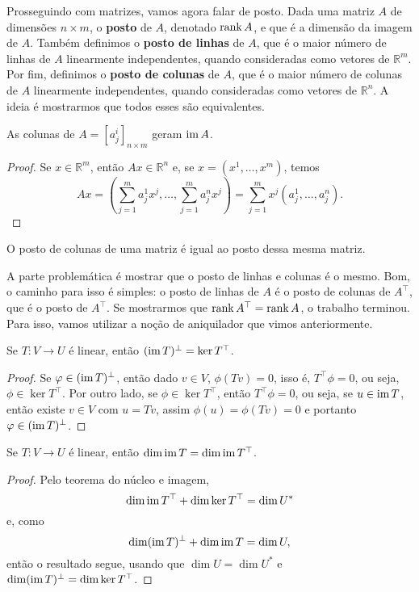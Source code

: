 Prosseguindo com matrizes, vamos agora falar de posto. Dada uma matriz $A$ de dimensões $n \times m$, o \textbf{posto} de $A$, denotado $\operatorname{rank} A$, e que é a dimensão da imagem de $A$. Também definimos o \textbf{posto de linhas} de $A$, que é o maior número de linhas de $A$ linearmente independentes, quando consideradas como vetores de $\mathbb{R}^m$. Por fim, definimos o \textbf{posto de colunas} de $A$, que é o maior número de colunas de $A$ linearmente independentes, quando consideradas como vetores de $\mathbb{R}^n$. A ideia é mostrarmos que todos esses são equivalentes.

\begin{proposition}
    As colunas de $A = [a^i_j]_{n \times m}$ geram $\operatorname{im} A$. 
\end{proposition}
\begin{proof}
    Se $x \in \mathbb{R}^m$, então $Ax \in \mathbb{R}^n$ e, se $x = (x^1, \dots, x^m)$, temos \begin{equation}
        Ax = \left(\sum_{j = 1}^m a^1_j x^j, \dots, \sum_{j = 1}^m a^n_j x^j\right) = \sum_{j = 1}^m x^j (a^1_j, \dots, a^n_j).
    \end{equation}
\end{proof}

\begin{corollary}
    O posto de colunas de uma matriz é igual ao posto dessa mesma matriz.
\end{corollary}

A parte problemática é mostrar que o posto de linhas e colunas é o mesmo. Bom, o caminho para isso é simples: o posto de linhas de $A$ é o posto de colunas de $A^\top$, que é o posto de $A^\top$. Se mostrarmos que $\operatorname{rank} A^\top = \operatorname{rank} A$, o trabalho terminou. Para isso, vamos utilizar a noção de aniquilador que vimos anteriormente.

\begin{theorem}
    Se $T \colon V \to U$ é linear, então $(\operatorname{im} T)^\perp = \ker T^\top$.
\end{theorem}
\begin{proof}
    Se $\varphi \in (\operatorname{im} T)^\perp$, então dado $v \in V$, $\phi(Tv) = 0$, isso é, $T^\top\phi = 0$, ou seja, $\phi \in \ker T^\top$. Por outro lado, se $\phi \in \ker T^\top$, então $T^\top \phi = 0$, ou seja, se $u \in \operatorname{im} T$, então existe $v \in V$ com $u = Tv$, assim $\phi(u) = \phi(Tv) = 0$ e portanto $\varphi \in (\operatorname{im} T)^\perp$.
\end{proof}

\begin{corollary}
    Se $T \colon V \to U$ é linear, então $\dim \operatorname{im} T = \dim \operatorname{im} T^\top$.
\end{corollary}
\begin{proof}
    Pelo teorema do núcleo e imagem, \begin{equation}
        \dim \operatorname{im} T^\top + \dim \ker T^\top = \dim U^*
    \end{equation} e, como \begin{equation}
        \dim (\operatorname{im} T)^\perp + \dim \operatorname{im} T = \dim U,
    \end{equation} então o resultado segue, usando que $\dim U = \dim U^*$ e $\dim (\operatorname{im} T)^\perp = \dim \ker T^\top$.
\end{proof}

